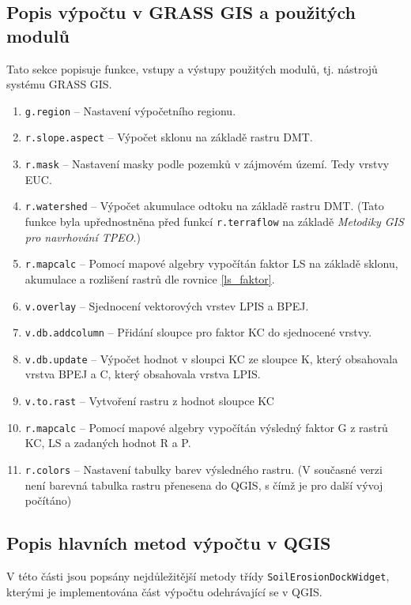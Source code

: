 \subsection{Popis výpočtu v GRASS GIS a použitých modulů}
\label{popisgrass}
Tato sekce
popisuje funkce, vstupy a výstupy použitých modulů, tj. nástrojů systému GRASS GIS.
\begin{enumerate}
	\item \texttt{g.region} – Nastavení výpočetního regionu.
	\item \texttt{r.slope.aspect} – Výpočet sklonu na základě
          rastru DMT.
	\item \texttt{r.mask} – Nastavení masky podle pozemků v zájmovém území. 
	Tedy vrstvy EUC.
	\item \texttt{r.watershed} – Výpočet akumulace odtoku na
základě rastru DMT. (Tato funkce byla upřednostněna před funkcí
\texttt{r.terraflow} na základě \textit{Metodiky GIS pro navrhování
TPEO}\cite{Dostal2014}.)
	\item \texttt{r.mapcalc} – Pomocí mapové algebry vypočítán
faktor LS na základě sklonu, akumulace a rozlišení rastrů dle rovnice
\ref{ls_faktor}.
	\item \texttt{v.overlay} – Sjednocení vektorových vrstev LPIS
a BPEJ.
	\item \texttt{v.db.addcolumn} – Přidání sloupce pro faktor KC
do sjednocené vrstvy.
	\item \texttt{v.db.update} – Výpočet hodnot v sloupci KC ze
sloupce K, který obsahovala vrstva BPEJ a C, který obsahovala vrstva
LPIS.
	\item \texttt{v.to.rast} – Vytvoření rastru z hodnot sloupce
KC
	\item \texttt{r.mapcalc} – Pomocí mapové algebry vypočítán
výsledný faktor G z rastrů KC, LS a zadaných hodnot R a P.
	\item \texttt{r.colors} – Nastavení tabulky barev výsledného rastru. (V
současné verzi není barevná tabulka rastru přenesena do QGIS, s čímž
je pro další vývoj počítáno)
\end{enumerate}
\newpage
\subsection{Popis hlavních metod výpočtu v QGIS} V této části jsou
popsány nejdůležitější metody třídy \texttt{SoilErosionDockWidget},
kterými je implementována část výpočtu odehrávající se v QGIS.
